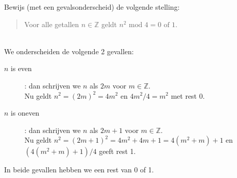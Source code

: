 \begin{answer}[Optioneel]
Bewijs (met een gevalsonderscheid) de volgende stelling:
\begin{quote}
    Voor alle getallen $n\in\mathbb{Z}$ geldt $n^2 \text{ mod } 4 = 0\text{ of }1$.
\end{quote}\mbox{}\\[2.5pt]
We onderscheiden de volgende 2 gevallen:
\begin{description}
\item[$n$ is even]: dan schrijven we $n$ als $2m$ voor $m\in\mathbb{Z}$.\\
Nu geldt $n^2=(2m)^2=4m^2$ en $4m^2/4=m^2$ met rest 0.
\item[$n$ is oneven]: dan schrijven we $n$ als $2m+1$ voor $m\in\mathbb{Z}$.\\
Nu geldt $n^2=(2m+1)^2=4m^2+4m+1=4(m^2+m)+1$ en $(4(m^2+m)+1)/4$ geeft rest 1.
\end{description}
In beide gevallen hebben we een rest van 0 of 1.
\end{answer}
